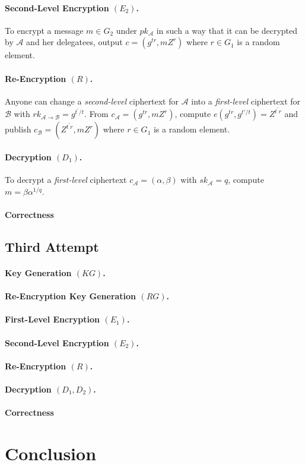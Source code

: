 \documentclass[a4paper,11pt]{article}
\begin{document}
\paragraph{Second-Level Encryption $(E_{2})$.} To encrypt a message $m \in G_{2}$ under $pk_{\mathcal{A}}$ in such a way that it can be decrypted by $\mathcal{A}$ and her delegatees, output $c = (g^{tr}, mZ^{r})$ where $r\in G_{1}$ is a random element.
\paragraph{Re-Encryption $(R)$.} Anyone can change a \emph{second-level} ciphertext for $\mathcal{A}$ into a \emph{first-level} ciphertext for $\mathcal{B}$ with $rk_{\mathcal{A}\rightarrow \mathcal{B}} = g^{t^\prime/t}$.
From $c_{\mathcal{A}} = (g^{tr},mZ^{r})$, compute $e(g^{tr},g^{t'/t}) = Z^{t^\prime r}$ and publish $c_{\mathcal{B}} = (Z^{t^\prime r},mZ^{r})$ where $r\in G_{1}$ is a random element.
\paragraph{Decryption $(D_{1})$.} To decrypt a \emph{first-level} ciphertext $c_{\mathcal{A}} = (\alpha, \beta)$ with $sk_{\mathcal{A}} = q$, compute $m = \beta\alpha^{1/q}$.

\paragraph{Correctness}

\subsection{Third Attempt}\label{sec:four:3}

\paragraph{Key Generation $(KG)$.} 
\paragraph{Re-Encryption Key Generation $(RG)$.} 
\paragraph{First-Level Encryption $(E_{1})$.} 
\paragraph{Second-Level Encryption $(E_{2})$.} 
\paragraph{Re-Encryption $(R)$.} 
\paragraph{Decryption $(D_{1}, D_{2})$.} 

    \paragraph{Correctness}

\section*{\textbf{Conclusion}}



\end{document}
